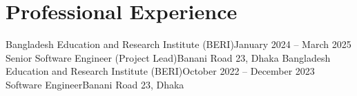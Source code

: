 \section{Professional Experience}
\resumeSubHeadingListStart
\resumeSubheading
{Bangladesh Education and Research Institute (BERI)}{January 2024 -- March 2025}
{Senior Software Engineer (Project Lead)}{Banani Road 23, Dhaka}
\resumeItemListStart
{}
\resumeItemListEnd
\resumeSubheading
{Bangladesh Education and Research Institute (BERI)}{October 2022 -- December 2023}
{Software Engineer}{Banani Road 23, Dhaka}
\resumeItemListStart
{}
\resumeItemListEnd
\resumeSubHeadingListEnd
